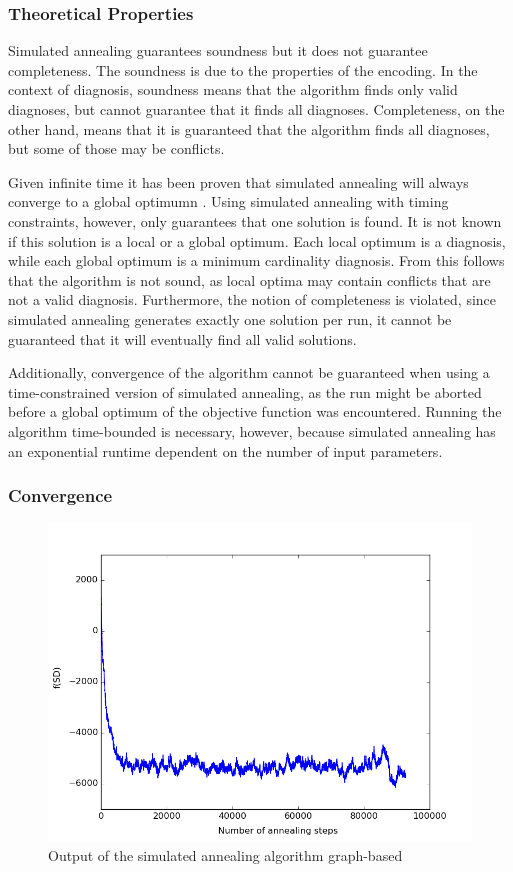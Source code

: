 \documentclass{article}
\begin{document}
\subsubsection{Theoretical Properties}
Simulated annealing guarantees soundness but it does not guarantee
completeness. The soundness is due to the properties of the
encoding. In the context of diagnosis, soundness means that the
algorithm finds only valid diagnoses, but cannot guarantee that it
finds all diagnoses. Completeness, on the other hand, means that it is
guaranteed that the algorithm finds all diagnoses, but some of those
may be conflicts.
\par
Given infinite time it has been proven that simulated annealing will
always converge to a global optimumn \cite{rajasekaran1990convergence}. Using simulated annealing with
timing constraints, however, only guarantees that one solution is
found. It is not known if this solution is a local or a global
optimum. Each local optimum is a diagnosis, while each global optimum
is a minimum cardinality diagnosis. From this follows that the
algorithm is not sound, as local optima may contain conflicts that are
not a valid diagnosis. Furthermore, the notion of completeness is
violated, since simulated annealing generates exactly one solution per
run, it cannot be guaranteed that it will eventually find all valid
solutions.
\par 
Additionally, convergence of the algorithm cannot be guaranteed when
using a time-constrained version of simulated annealing, as the run
might be aborted before a global optimum of the objective function was
encountered. Running the algorithm time-bounded is necessary, however,
because simulated annealing has an exponential runtime dependent on
the number of input parameters.

\subsubsection{Convergence}

\begin{figure}[htb]
	\centering
	\includegraphics[scale=0.5]{figures/sa}
	\caption{Output of the simulated annealing algorithm graph-based
		\label{fig:saGraph}}
\end{figure}
\end{document}
